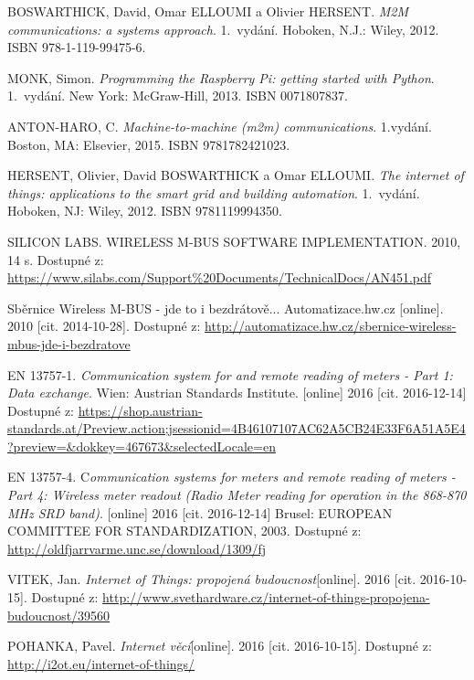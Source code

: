 \begin{literatura}{99}

 BOSWARTHICK, David, Omar ELLOUMI a Olivier HERSENT. \textit{M2M communications: a systems approach}. 1.~vydání. Hoboken, N.J.: Wiley, 2012. ISBN 978-1-119-99475-6.

 MONK, Simon. \textit{Programming the Raspberry Pi: getting started with Python}. 1.~vydání. New York: McGraw-Hill, 2013. ISBN 0071807837.
	
 ANTON-HARO, C. \textit{Machine-to-machine (m2m) communications}. 1.vydání. Boston, MA: Elsevier, 2015. ISBN 9781782421023.	

 HERSENT, Olivier, David BOSWARTHICK a Omar ELLOUMI. \textit{The internet of things: applications to the smart grid and building automation}. 1.~vydání. Hoboken, NJ: Wiley, 2012. ISBN 9781119994350.

 SILICON LABS. WIRELESS M-BUS SOFTWARE IMPLEMENTATION. 2010, 14 s. Dostupné z: \url{https://www.silabs.com/Support\%20Documents/TechnicalDocs/AN451.pdf}

 Sběrnice Wireless M-BUS - jde to i bezdrátově... Automatizace.hw.cz [online]. 2010 [cit. 2014-10-28]. Dostupné z: \url{http://automatizace.hw.cz/sbernice-wireless-mbus-jde-i-bezdratove}

 EN 13757-1. \textit{Communication system for and remote reading of meters - Part 1: Data exchange}. Wien: Austrian Standards Institute. [online] 2016 [cit. 2016-12-14]  Dostupné z: \url{https://shop.austrian-standards.at/Preview.action;jsessionid=4B46107107AC62A5CB24E33F6A51A5E4?preview=\&dokkey=467673\&selectedLocale=en}
				
 EN 13757-4. C\textit{ommunication systems for meters and remote reading of meters - Part 4: Wireless meter readout (Radio Meter reading for operation in the 868-870 MHz SRD band)}. [online] 2016 [cit. 2016-12-14] Brusel: EUROPEAN COMMITTEE FOR STANDARDIZATION, 2003. Dostupné z: \url{http://oldfjarrvarme.unc.se/download/1309/fj}

 VITEK, Jan. \textit{Internet of Things: propojená budoucnost}[online]. 2016 [cit. 2016-10-15]. Dostupné z: \url{http://www.svethardware.cz/internet-of-things-propojena-budoucnost/39560}

 POHANKA, Pavel. \textit{Internet věcí}[online]. 2016 [cit. 2016-10-15]. Dostupné z: \url{http://i2ot.eu/internet-of-things/}


\end{literatura}
